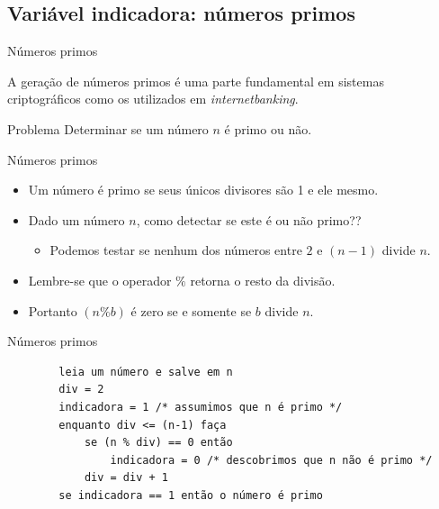 \documentclass[handout]{beamer}
\begin{document}
\subsection{Variável indicadora: números primos}%

\begin{frame}{Números primos}
    
    A geração de números primos é uma parte fundamental em sistemas criptográficos como os utilizados em {\it internetbanking}.

    \begin{block}{Problema}
        Determinar se um número $n$ é primo ou não.
    \end{block}
\end{frame}

\begin{frame}{Números primos}
    \begin{itemize}[<+->]
        \item Um número é primo se seus únicos divisores são 1 e ele mesmo.
        \item Dado um número $n$, como detectar se este é ou não primo??
        \begin{itemize}
            \item Podemos testar se nenhum dos números entre $2$ e $(n-1)$ divide $n$.
        \end{itemize}
        \item Lembre-se que o operador $\%$ retorna o resto da divisão.
        \item Portanto $(n\%b)$ é zero se e somente se $b$ divide $n$.
    \end{itemize}
\end{frame}

\begin{frame}[fragile]{Números primos}
    
    \begin{verbatim}
        leia um número e salve em n
        div = 2
        indicadora = 1 /* assumimos que n é primo */
        enquanto div <= (n-1) faça
            se (n % div) == 0 então
                indicadora = 0 /* descobrimos que n não é primo */
            div = div + 1
        se indicadora == 1 então o número é primo
    \end{verbatim}
\end{frame}
\end{document}
